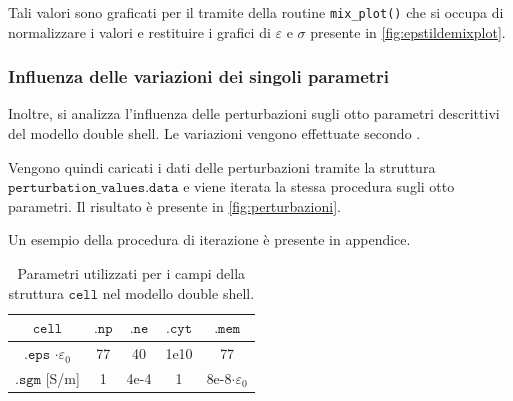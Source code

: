 Tali valori sono graficati per il tramite della routine \texttt{mix\_plot()} che si occupa di normalizzare i valori e restituire i grafici di $\varepsilon$ e $\sigma$ presente in \cref{fig:epstildemixplot}.









\subsubsection{Influenza delle variazioni dei singoli parametri}



Inoltre, si analizza l'influenza delle perturbazioni sugli otto parametri descrittivi del modello double shell. Le variazioni vengono effettuate secondo \citeauthor{irimajiri_dielectric_1979}.

Vengono quindi caricati i dati delle perturbazioni tramite la struttura $\mathtt{perturbation\_values.data}$ e viene iterata la stessa procedura sugli otto parametri. Il risultato è presente in \cref{fig:perturbazioni}. 

Un esempio della procedura di iterazione è presente in appendice.

\begin{table}[t!]
	\centering
	\small{
		\begin{tabular}{|c|c|c|c|c|}
			\hline
			$\mathtt{cell}$ & $\mathtt{.np}$  & $\mathtt{.ne}$  &$\mathtt{.cyt}$ & $\mathtt{.mem}$ \\
			\hline
			$\mathtt{.eps}$ $\cdot \varepsilon_0$ &77  & 40 & 1e10 &77  \\
			\hline
			$\mathtt{.sgm}$ [S/m]& 1 & 4e-4 & 1 & 8e-8$\cdot \varepsilon_0$ \\
			\hline
	\end{tabular}}
	\caption{Parametri utilizzati per i campi della struttura $\mathtt{cell}$ nel modello double shell.}
	\label{tab:double_shell}
\end{table}


